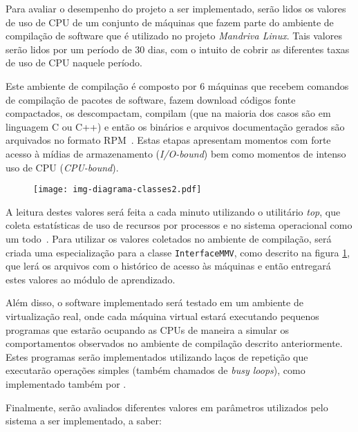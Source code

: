 
Para avaliar o desempenho do projeto a ser implementado, serão lidos os
valores de uso de CPU de um conjunto de máquinas que fazem parte do
ambiente de compilação de software que é utilizado no projeto
\emph{Mandriva Linux}. Tais valores serão lidos por um período de 30 dias,
com o intuito de cobrir as diferentes taxas de uso de CPU naquele período.

Este ambiente de compilação é composto por $6$ máquinas que recebem
comandos de compilação de pacotes de software, fazem download códigos fonte
compactados, os descompactam, compilam (que na maioria dos casos são em
linguagem C ou C++) e então os binários e arquivos documentação gerados são
arquivados no formato RPM~\cite{ewing1996rpm}. Estas etapas apresentam
momentos com forte acesso à mídias de armazenamento (\emph{I/O-bound}) bem
como momentos de intenso uso de CPU (\emph{CPU-bound}).

\begin{figure}[htp]
\centering
\texttt{[image: img-diagrama-classes2.pdf]}
\label{fig:diagramaclasses2}
\end{figure}

A leitura destes valores será feita a cada minuto utilizando o utilitário
\emph{top}, que coleta estatísticas de uso de recursos por processos e no
sistema operacional como um todo~\cite{andresen2004monitoring}. Para utilizar
os valores coletados no ambiente de compilação, será criada uma especialização
para a classe \texttt{InterfaceMMV}, como descrito na figura
\ref{fig:diagramaclasses2}, que lerá os arquivos com o histórico de acesso às
máquinas e então entregará estes valores ao módulo de aprendizado.

Além disso, o software implementado será testado em um ambiente de
virtualização real, onde cada máquina virtual estará executando pequenos
programas que estarão ocupando as CPUs de maneira a simular os
comportamentos observados no ambiente de compilação descrito anteriormente.
Estes programas serão implementados utilizando laços de repetição que
executarão operações simples (também chamados de \emph{busy loops}), como
implementado também por .

Finalmente, serão avaliados diferentes valores em parâmetros utilizados
pelo sistema a ser implementado, a saber:

